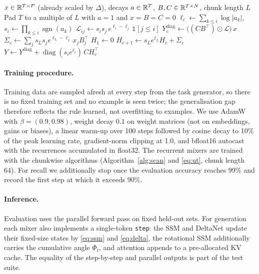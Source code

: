 \begin{algorithm}[htbp]
\caption{Chunkwise selective scan used for training (one head; batch omitted)}
\label{alg:scan}
\begin{algorithmic}[1]
\Require $x\in\mathbb{R}^{T\times P}$ (already scaled by $\Delta$), decays $a\in\mathbb{R}^{T}$, $B,C\in\mathbb{R}^{T\times N}$, chunk length $L$
\State Pad $T$ to a multiple of $L$ with $a=1$ and $x=B=C=0$ 
  \State $\ell_i \gets \sum_{k\le i}\log|a_k|$, \ $s_i \gets \prod_{k\le i}\operatorname{sgn}(a_k)$ 
  \State $\mathcal{L}_{ij} \gets s_is_j\,e^{\ell_i-\ell_j}\,\mathbb{1}[j\le i]$
  \State $Y^{\text{diag}}_c \gets \big((C B^\top)\odot \mathcal{L}\big)\, x$ 
  \State $\Sigma_c \gets \sum_j s_Ls_j e^{\ell_L-\ell_j}\, x_j B_j^\top$ 
\EndFor
\State $H_1 \gets 0$
  \State $H_{c+1} \gets s_L e^{\ell_L} H_c + \Sigma_c$ 
\EndFor
\State $Y \gets Y^{\text{diag}} + \operatorname{diag}(s_i e^{\ell_i})\, C H_c^\top$ 
\end{algorithmic}
\end{algorithm}

\paragraph{Training procedure.} Training data are sampled afresh at every step from the task generator, so
there is no fixed training set and no example is seen twice; the generalisation gap therefore reflects
the rule learned, not overfitting to examples. We use AdamW \citep{loshchilov2019adamw} with
$\beta=(0.9,0.98)$, weight decay $0.1$ on weight matrices (not on embeddings, gains or biases), a linear warm-up over 100 steps followed by
cosine decay to 10\% of the peak learning rate, gradient-norm clipping at 1.0, and bfloat16 autocast with
the recurrences accumulated in float32. The recurrent mixers are trained with the chunkwise algorithms
(Algorithm~\ref{alg:scan} and \eqref{eq:ut}, chunk length 64). For recall we additionally stop once the
evaluation accuracy reaches 99\% and record the first step at which it exceeds 90\%.

\paragraph{Inference.} Evaluation uses the parallel forward pass on fixed held-out sets. For generation
each mixer also implements a single-token \texttt{step}: the SSM and DeltaNet update their fixed-size states
by \eqref{eq:ssm} and \eqref{eq:delta}, the rotational SSM additionally carries the cumulative angle
$\Phi_t$, and attention appends to a pre-allocated KV cache. The equality of the step-by-step and parallel
outputs is part of the test suite.

